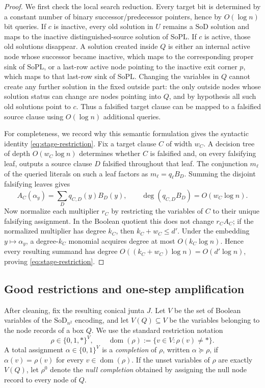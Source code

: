 \documentclass[11pt]{article}
\theoremstyle{definition}
\newcommand{\SoPL}{\mathrm{SoPL}}
\newcommand{\SoD}{\mathrm{SoD}}
\begin{document}
\begin{proof}
We first check the local search reduction.  Every target bit is determined by a
constant number of binary successor/predecessor pointers, hence by $O(\log n)$ bit
queries.  If $c$ is inactive, every old solution in $U$ remains a $\SoD$ solution and
maps to the inactive distinguished-source solution of $\SoPL$.  If $c$ is active,
those old solutions disappear.  A solution created inside $Q$ is either an internal
active node whose successor became inactive, which maps to the corresponding proper
sink of $\SoPL$, or a last-row active node pointing to the inactive exit corner $p$,
which maps to that last-row sink of $\SoPL$.  Changing the variables in $Q$ cannot create any further
solution in the fixed outside part: the only outside nodes whose solution status can
change are nodes pointing into $Q$, and by hypothesis all such old solutions point to
$c$.  Thus a falsified target clause can be mapped to a falsified source clause using
$O(\log n)$ additional queries.

For completeness, we record why this semantic formulation gives the syntactic
identity \eqref{eq:stage-restriction}.  Fix a target clause $C$ of width $w_C$.
A decision tree of depth $O(w_C\log n)$ determines whether $C$ is falsified and, on
every falsifying leaf, outputs a source clause $D$ falsified throughout that leaf.
The conjunction $m_\ell$ of the queried literals on such a leaf factors as
$m_\ell=q_\ell B_D$.  Summing the disjoint falsifying leaves gives
\[
  A_C(\alpha_y)=\sum_D q_{C,D}(y)B_D(y),
  \qquad
  \deg(q_{C,D}B_D)=O(w_C\log n).
\]
Now normalize each multiplier $r_C$ by restricting the variables of $C$ to their
unique falsifying assignment.  In the Boolean quotient this does not change
$r_CA_C$; if the normalized multiplier has degree $k_C$, then
$k_C+w_C\le d'$.  Under the embedding $y\mapsto\alpha_y$, a degree-$k_C$ monomial acquires degree at most
$O(k_C\log n)$.  Hence every resulting summand has degree
$O((k_C+w_C)\log n)=O(d'\log n)$, proving \eqref{eq:stage-restriction}.
\end{proof}

\subsection{Good restrictions and one-step amplification}

After cleaning, fix the resulting conical junta $J$.  Let $V$ be the set of Boolean
variables of the $\SoD_{n^2}$ encoding, and let $V(Q)\subseteq V$ be the variables
belonging to the node records of a box $Q$.  We use the standard restriction notation
\[
  \rho\in\{0,1,*\}^{V},
  \qquad
  \operatorname{dom}(\rho):=\{v\in V:\rho(v)\neq *\}.
\]
A total assignment $\alpha\in\{0,1\}^{V}$ is a \emph{completion} of $\rho$, written
$\alpha\succeq\rho$, if $\alpha(v)=\rho(v)$ for every
$v\in\operatorname{dom}(\rho)$.  If the unset variables of $\rho$ are exactly
$V(Q)$, let $\rho^{0}$ denote the \emph{null completion} obtained by assigning the
null node record to every node of $Q$.
\end{document}
